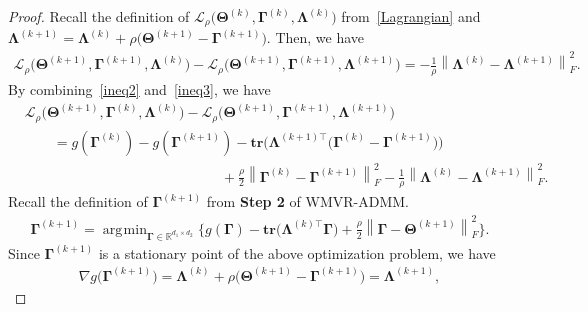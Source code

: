 \documentclass[alpha-refs]{wiley-article}
\DeclareMathOperator*{\argmin}{\arg\!\min}
\begin{document}
\begin{proof}
Recall the definition of $\mathcal{L}_{\rho} \big( \boldsymbol{\Theta}^{(k)},\boldsymbol{\Gamma}^{(k)},\boldsymbol{\Lambda}^{(k)} \big)$ from~\eqref{Lagrangian} and $\boldsymbol{\Lambda}^{(k+1)}=\boldsymbol{\Lambda}^{(k)}+\rho\big(\boldsymbol{\Theta}^{(k+1)}-\boldsymbol{\Gamma}^{(k+1)}\big)$.
Then, we have
\begin{align} \label{ineq3}
    \mathcal{L}_{\rho} \big( \boldsymbol{\Theta}^{(k+1)},\boldsymbol{\Gamma}^{(k+1)},\boldsymbol{\Lambda}^{(k)} \big) 
    - \mathcal{L}_{\rho} \big( \boldsymbol{\Theta}^{(k+1)},\boldsymbol{\Gamma}^{(k+1)},\boldsymbol{\Lambda}^{(k+1)} \big) 
    = -\frac{1}{\rho}\left\| \boldsymbol{\Lambda}^{(k)}-\boldsymbol{\Lambda}^{(k+1)} \right\|_{F}^{2}.
\end{align}
By combining~\eqref{ineq2} and~\eqref{ineq3}, we have
\begin{align} \label{ineq4}
    &\mathcal{L}_{\rho} \big( \boldsymbol{\Theta}^{(k+1)},\boldsymbol{\Gamma}^{(k)},\boldsymbol{\Lambda}^{(k)} \big) 
    - \mathcal{L}_{\rho} \big( \boldsymbol{\Theta}^{(k+1)},\boldsymbol{\Gamma}^{(k+1)},\boldsymbol{\Lambda}^{(k+1)} \big) \nonumber \\
    &\qquad = g(\boldsymbol{\Gamma}^{(k)})-g(\boldsymbol{\Gamma}^{(k+1)}) - \textbf{tr}\big( \boldsymbol{\Lambda}^{(k+1)\top}\big(\boldsymbol{\Gamma}^{(k)}-\boldsymbol{\Gamma}^{(k+1)}\big)\big) \nonumber \\
    &\qquad \qquad \qquad \qquad \qquad \qquad \qquad
    + \frac{\rho}{2}\left\| \boldsymbol{\Gamma}^{(k)}-\boldsymbol{\Gamma}^{(k+1)} \right\|_{F}^{2} -\frac{1}{\rho}\left\| \boldsymbol{\Lambda}^{(k)}-\boldsymbol{\Lambda}^{(k+1)} \right\|_{F}^{2}.
\end{align}
Recall the definition of $\boldsymbol{\Gamma}^{(k+1)}$ from \textbf{Step 2} of WMVR-ADMM.
\begin{align*}
    \boldsymbol{\Gamma}^{(k+1)} = \argmin_{\boldsymbol{\Gamma} \in \mathbb{R}^{d_{1} \times d_{2}}}
    \bigg\{ g(\boldsymbol{\Gamma}) - \textbf{tr}\big(\boldsymbol{\Lambda}^{(k)\top}\boldsymbol{\Gamma}\big)+\frac{\rho}{2}\left\|\boldsymbol{\Gamma}-\boldsymbol{\Theta}^{(k+1)} \right\|_{F}^{2} \bigg\}.
\end{align*}
Since $\boldsymbol{\Gamma}^{(k+1)}$ is a stationary point of the above optimization problem, we have
\begin{align*}
    \nabla g\big( \boldsymbol{\Gamma}^{(k+1)} \big)
    = \boldsymbol{\Lambda}^{(k)} + \rho\big( \boldsymbol{\Theta}^{(k+1)}-\boldsymbol{\Gamma}^{(k+1)} \big)
    = \boldsymbol{\Lambda}^{(k+1)},
\end{align*}

\end{proof}
\end{document}
